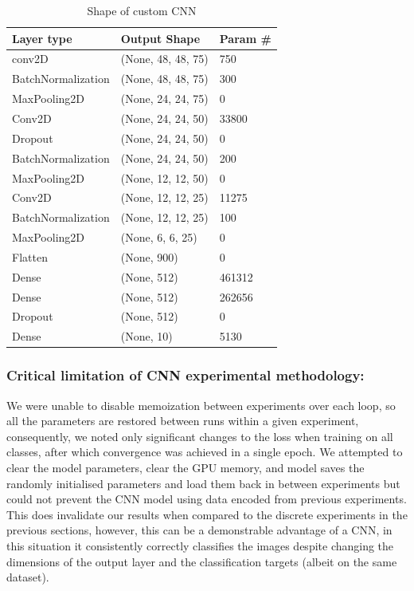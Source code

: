 \documentclass[11pt]{article}
\begin{document}
  \begin{table}[h]\caption {Shape of custom CNN}
    \centering
    \begin{tabular}{@{}lll@{}} 
    \toprule
    Layer type & Output Shape & Param \# \\ \midrule
    conv2D & (None, 48, 48, 75) & 750 \\ \midrule
    BatchNormalization & (None, 48, 48, 75) & 300 \\ \midrule
    MaxPooling2D & (None, 24, 24, 75) & 0 \\ \midrule
    Conv2D & (None, 24, 24, 50) & 33800 \\ \midrule
    Dropout & (None, 24, 24, 50) & 0 \\ \midrule
    BatchNormalization & (None, 24, 24, 50) & 200 \\ \midrule
    MaxPooling2D & (None, 12, 12, 50) & 0 \\ \midrule
    Conv2D & (None, 12, 12, 25) & 11275 \\ \midrule
    BatchNormalization & (None, 12, 12, 25) & 100 \\ \midrule
    MaxPooling2D & (None, 6, 6, 25) & 0 \\ \midrule
    Flatten & (None, 900) & 0 \\ \midrule
    Dense & (None, 512) & 461312 \\ \midrule
    Dense & (None, 512) & 262656 \\ \midrule
    Dropout & (None, 512) & 0 \\ \midrule
    Dense & (None, 10) & 5130 \\ \bottomrule
    \end{tabular}
  \end{table}


\subsubsection{Critical limitation of CNN experimental methodology:}
We were unable to disable memoization between experiments over each loop, so all the parameters are restored between runs within a given experiment, consequently, we noted only significant changes to the loss when training on all classes, after which convergence was achieved in a single epoch. We attempted to clear the model parameters, clear the GPU memory, and model saves the randomly initialised parameters and load them back in between experiments but could not prevent the CNN model using data encoded from previous experiments. This does invalidate our results when compared to the discrete experiments in the previous sections, however, this can be a demonstrable advantage of a CNN, in this situation it consistently correctly classifies the images despite changing the dimensions of the output layer and the classification targets (albeit on the same dataset).
\par
\end{document}
